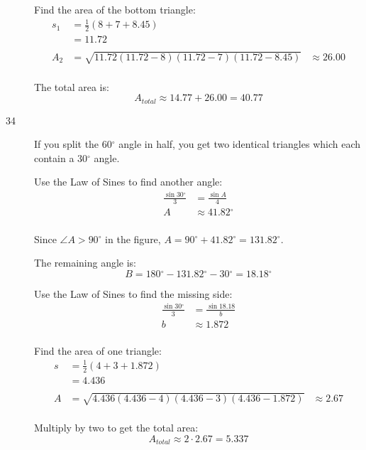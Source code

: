\documentclass{exam}
\newcommand{\dg}{\ensuremath{^\circ}}
\begin{document}
\begin{description}
        Find the area of the bottom triangle:
        \begin{align*}
          s_1 & = \frac{1}{2}(8 + 7 + 8.45) \\
              & = 11.72 \\
          \\
          A_2 & = \sqrt{11.72 (11.72 - 8)(11.72 - 7) (11.72 - 8.45)}
              & \approx 26.00 \\
        \end{align*}

        The total area is: 
        \[
          A_{total} \approx 14.77 + 26.00 = \boxed{ 40.77 }
        \]

      \item[34]
        If you split the $60 \dg$ angle in half, you get two identical triangles which each contain a $30 \dg$ angle.

        Use the Law of Sines to find another angle:
        \begin{align*}
          \frac{\sin 30 \dg}{3} & = \frac{\sin A}{4} \\
          A                     & \approx 41.82 \dg \\
        \end{align*}

        Since $\angle A > 90 \dg$ in the figure, $A = 90 \dg + 41.82 \dg = 131.82 \dg$.

        The remaining angle is:
        \[
          B = 180 \dg - 131.82 \dg - 30 \dg = 18.18 \dg
        \]

        Use the Law of Sines to find the missing side:
        \begin{align*}
          \frac{\sin 30 \dg}{3} & = \frac{\sin 18.18}{b} \\
          b                     & \approx 1.872 \\
        \end{align*}

        Find the area of one triangle:
        \begin{align*}
          s  & = \frac{1}{2}(4 + 3 + 1.872) \\
             & = 4.436 \\
          \\
          A  & = \sqrt{4.436 (4.436 - 4)(4.436 - 3) (4.436 - 1.872)}
             & \approx 2.67 \\
        \end{align*}

        Multiply by two to get the total area:
        \[
          A_{total} \approx 2 \cdot 2.67 = \boxed{ 5.337 }
        \]


\end{description}
\end{document}

